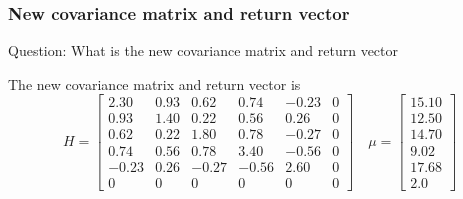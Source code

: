 \subsubsection{\bfseries New covariance matrix and return vector}
\begin{shaded}
{ Question: What is the new covariance matrix and return vector}
\end{shaded}
The new covariance matrix and return vector is
$$H=\begin{bmatrix}
2.30 & 0.93 & 0.62 & 0.74 & -0.23 & 0 \\
0.93 & 1.40 & 0.22 & 0.56 & 0.26 & 0 \\
0.62 & 0.22 & 1.80 & 0.78 & -0.27 & 0 \\
0.74 & 0.56 & 0.78 & 3.40 & -0.56 & 0 \\
-0.23 & 0.26 & -0.27 & -0.56 & 2.60 & 0 \\
0 & 0 & 0 & 0 & 0 &0
\end{bmatrix}\quad \mu=\begin{bmatrix}
15.10\\
12.50\\
14.70\\
9.02\\
17.68\\
2.0
\end{bmatrix}$$
